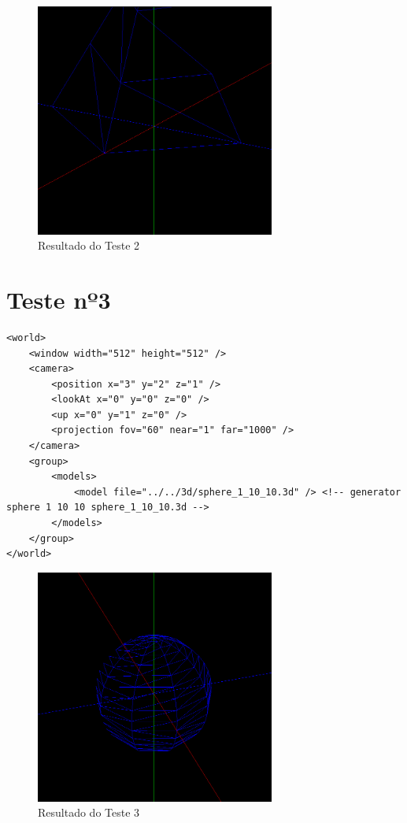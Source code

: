 \documentclass[11pt,a4paper]{report}%
\begin{document}
\begin{figure}[H]
	\centering
	\includegraphics[width=0.7\textwidth]{images/cone2.png}
	\caption{Resultado do Teste 2} \label{fig:cone2}
\end{figure}

\section{Teste nº3}
\begin{lstlisting}[caption={XML do Teste 3}, label={teste3}]
<world> 
    <window width="512" height="512" />
    <camera> 
        <position x="3" y="2" z="1" />
        <lookAt x="0" y="0" z="0" />
        <up x="0" y="1" z="0" />
        <projection fov="60" near="1" far="1000" /> 
    </camera>
    <group> 
        <models> 
            <model file="../../3d/sphere_1_10_10.3d" /> <!-- generator sphere 1 10 10 sphere_1_10_10.3d -->
        </models>
    </group>
</world>
\end{lstlisting}

\begin{figure}[H]
	\centering
	\includegraphics[width=0.7\textwidth]{images/sphere.png}
	\caption{Resultado do Teste 3} \label{fig:sphere}
\end{figure}
\end{document}
